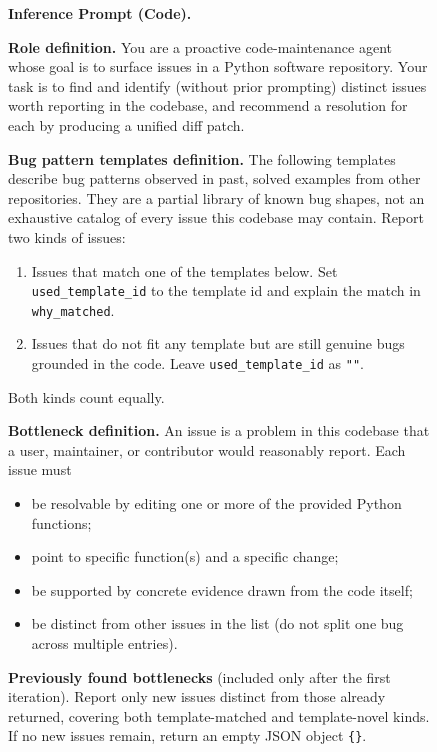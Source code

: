 \begin{figure}[!t]
\centering
\begin{tcolorbox}[colback=gray!5, colframe=gray!50,
                  boxrule=0.5pt, arc=2mm,
                  left=4pt, right=4pt, top=3pt, bottom=3pt]
\small
\textbf{Inference Prompt (Code).}

\medskip
\textbf{Role definition.} You are a proactive code-maintenance agent whose goal is to surface issues in a Python software repository. Your task is to find and identify (without prior prompting) distinct issues worth reporting in the codebase, and recommend a resolution for each by producing a unified diff patch.

\medskip
\textbf{Bug pattern templates definition.} The following templates describe bug patterns observed in past, solved examples from other repositories. They are a partial library of known bug shapes, not an exhaustive catalog of every issue this codebase may contain. Report two kinds of issues:
\begin{enumerate}[topsep=0pt, itemsep=0ex, parsep=0pt, left=14pt]
   \item Issues that match one of the templates below. Set \texttt{used\_template\_id} to the template id and explain the match in \texttt{why\_matched}.
   \item Issues that do not fit any template but are still genuine bugs grounded in the code. Leave \texttt{used\_template\_id} as \texttt{""}.
\end{enumerate}
Both kinds count equally.

\medskip
\textbf{Bottleneck definition.} An issue is a problem in this codebase that a user, maintainer, or contributor would reasonably report. Each issue must
\begin{itemize}[topsep=0pt, itemsep=0ex, parsep=0pt, left=12pt]
   \item be resolvable by editing one or more of the provided Python functions;
   \item point to specific function(s) and a specific change;
   \item be supported by concrete evidence drawn from the code itself;
   \item be distinct from other issues in the list (do not split one bug across multiple entries).
\end{itemize}

\medskip
\textbf{Previously found bottlenecks} (included only after the first iteration). Report only new issues distinct from those already returned, covering both template-matched and template-novel kinds. If no new issues remain, return an empty JSON object \texttt{\{\}}.


\end{tcolorbox}
\end{figure}
